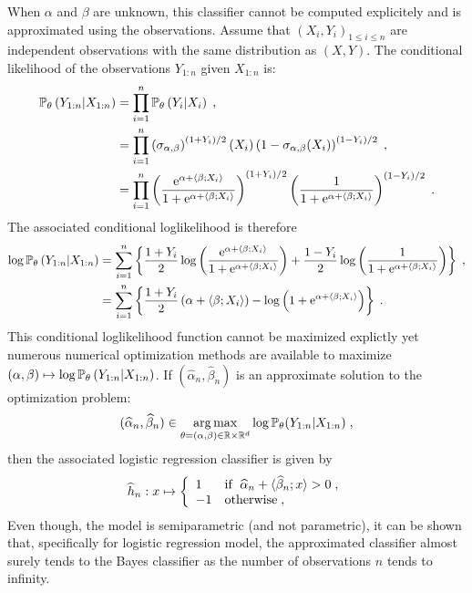When $\alpha$ and $\beta$ are unknown, this classifier cannot be computed explicitely and is approximated using the observations. Assume that  $(X_i,Y_i)_{1\leqslant i\leqslant n}$ are independent observations with the same distribution as $(X,Y)$. The conditional  likelihood of the observations $Y_{1:n}$  given $X_{1:n}$ is:
\begin{align*}
\mathbb{P}_{\theta}\left(Y_{1:n}\middle |X_{1:n}\right) &=\prod_{i=1}^n \mathbb{P}_{\theta}\left(Y_{i} \middle |X_{i}\right)\;,\\
&= \prod_{i=1}^n \left(\sigma_{\alpha,\beta}\right)^{(1+Y_i)/2}(X_i)\left(1-\sigma_{\alpha,\beta}(X_i)\right)^{(1-Y_i)/2}\;,\\
&=  \prod_{i=1}^n \left(\frac{\mathrm{e}^{\alpha + \langle \beta;X_i\rangle}}{1+\mathrm{e}^{\alpha + \langle \beta;X_i\rangle}}\right)^{(1+Y_i)/2}\left( \frac{1}{1+\mathrm{e}^{\alpha + \langle \beta;X_i\rangle}}\right)^{(1-Y_i)/2}\;.
\end{align*}
The associated conditional loglikelihood is therefore
\begin{align*}
\log \mathbb{P}_{\theta}\left(Y_{1:n}\middle |X_{1:n}\right) &=\sum_{i=1}^n \left\{\frac{1+Y_i}{2}\log\left(\frac{\mathrm{e}^{\alpha + \langle \beta;X_i\rangle}}{1+\mathrm{e}^{\alpha + \langle \beta;X_i\rangle}}\right) + \frac{1-Y_i}{2}\log\left(\frac{1}{1+\mathrm{e}^{\alpha + \langle \beta;X_i\rangle}}\right) \right\}\;,\\
&= \sum_{i=1}^n \left\{ \frac{1+Y_i}{2}\left(\alpha + \langle \beta;X_i\rangle\right) - \log\left(1+\mathrm{e}^{\alpha + \langle \beta;X_i\rangle}\right)\right\}\;.
\end{align*}
This conditional loglikelihood function cannot be maximized explictly yet numerous numerical optimization methods are available to maximize $(\alpha,\beta)\mapsto \log \mathbb{P}_{\theta}\left(Y_{1:n}\middle |X_{1:n}\right)$. If $(\widehat \alpha_n,\widehat \beta_n)$ is an approximate solution to the optimization problem:
\begin{equation}
\label{eq:loglik:logistic}
(\widehat \alpha_n,\widehat \beta_n)\in \argmax_{\theta=(\alpha,\beta)\in\rset\times\rset^d}\log \bP_{\theta}(Y_{1:n}|X_{1:n})\eqsp,
\end{equation}
then the associated logistic regression classifier is given by
\[
\widehat h_{n}: x\mapsto  \left\{
    \begin{array}{ll}
       1 & \mbox{if }\; \widehat \alpha_n + \langle \widehat \beta_n;x\rangle>0\;, \\
        -1 & \mbox{otherwise}\;,
    \end{array}
\right.
\]
Even though, the model is semiparametric (and not parametric), it can be shown that, specifically for logistic regression model, the approximated classifier almost surely tends to the Bayes classifier as the number of observations $n$ tends to infinity.

